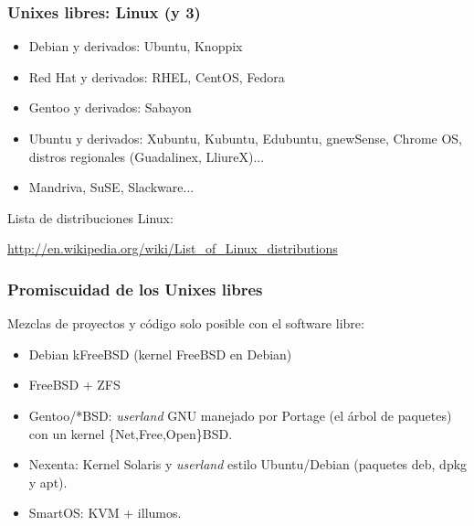 \documentclass{beamer}
\begin{document}

\begin{frame}
\frametitle{Unixes libres: Linux (y 3)}

\begin{itemize}

\item Debian y derivados: Ubuntu, Knoppix
\item Red Hat y derivados: RHEL, CentOS, Fedora
\item Gentoo y derivados: Sabayon
\item Ubuntu y derivados: Xubuntu, Kubuntu, Edubuntu, gnewSense, Chrome OS, distros regionales (Guadalinex, LliureX)...
\item Mandriva, SuSE, Slackware...

\end{itemize}

\pause

\begin{center}
Lista de distribuciones Linux: 
\begin{small}
\url{http://en.wikipedia.org/wiki/List_of_Linux_distributions}
\end{small}
\end{center}


\end{frame}


\begin{frame}
\frametitle{Promiscuidad de los Unixes libres}

Mezclas de proyectos y código \alert{solo} posible con el software libre:

\begin{itemize}

\item Debian kFreeBSD (kernel FreeBSD en Debian)
\item FreeBSD + ZFS
\item Gentoo/*BSD: \textit{userland} GNU manejado por Portage (el árbol de paquetes) con un kernel \{Net,Free,Open\}BSD.
\item Nexenta: Kernel Solaris y \textit{userland} estilo Ubuntu/Debian (paquetes deb, dpkg y apt).
\item SmartOS: KVM + illumos.
\end{itemize}

\end{frame}
\end{document}
